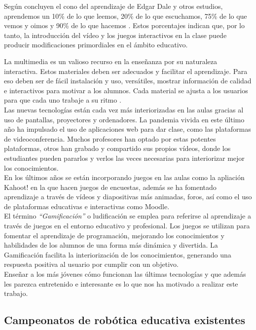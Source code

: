 Según concluyen el cono del aprendizaje de Edgar Dale y otros estudios, aprendemos un 10\% de lo que leemos, 20\% de lo que escuchamos, 75\% de lo que vemos y oimos y 
90\% de lo que hacemos \cite{videoeducativo}\cite{aprendizaje}. Estos porcentajes indican que, por lo tanto, la introducción del vídeo y los juegos interactivos en la clase puede producir modificaciones primordiales en el ámbito educativo.

La multimedia es un valioso recurso en la enseñanza por su naturaleza interactiva. Estos  materiales  deben ser adecuados y facilitar el aprendizaje. Para eso deben ser de fácil instalación y uso, versátiles, mostrar información de calidad e interactivos para motivar a los alumnos. Cada material se ajusta a los usuarios para que cada uno  trabaje a su ritmo \cite{importanciamultimedia}.
\\
Las nuevas tecnologías están cada vez más interiorizadas en las aulas gracias al uso de pantallas, proyectores y ordenadores. La pandemia vivida en este último año ha impulsado el uso de aplicaciones web para dar clase, como las plataformas de videoconferencia. Muchos profesores han optado por estas potentes plataformas, otros han grabado y compartido sus propios vídeos, donde los estudiantes pueden pararlos y verlos las veces necesarias para interiorizar mejor los conocimientos.
\\
En los últimos años se están incorporando juegos en las aulas como la apliación Kahoot! \cite{kahoot} en la que hacen juegos de encuestas, además se ha fomentado aprendizaje a través de vídeos y diapositivas más animadas, foros, así como el uso de plataformas educativas e interactivas como Moodle.
\\

 El término \textit{``Gamificación''} o ludificación se emplea para referirse al aprendizaje a través de juegos en el entorno educativo y profesional. Los juegos se utilizan para fomentar el aprendizaje de programación, mejorando los conocimientos y habilidades de los alumnos de una forma más dinámica y divertida. La Gamificación facilita la interiorización de los conocimientos, generando una respuesta positiva al usuario por cumplir con un objetivo.
 \\
 Enseñar a los más jóvenes cómo funcionan las últimas tecnologías y que además les parezca entretenido e interesante es lo que nos ha motivado a realizar este trabajo.
 
 
\subsection{Campeonatos de robótica educativa existentes}

